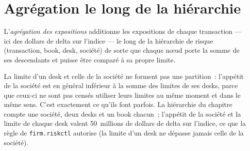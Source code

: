 \section{Agrégation le long de la hiérarchie}

\begin{definition}\label{def:pl:real-time-risk:aggregation}
L'\emph{agrégation des expositions} additionne les expositions de chaque transaction --- ici des dollars de delta sur l'indice --- le long de la
hiérarchie de risque (transaction, book, desk, société) de sorte que chaque nœud porte la somme de ses descendants et puisse être comparé à sa propre limite.
\end{definition}

La limite d'un desk et celle de la société ne forment pas une partition~: l'appétit de la société est en général inférieur à la somme des limites de ses desks, parce que ceux-ci
ne sont pas censés utiliser leurs limites au même moment et dans le même sens. C'est exactement ce qu'ils font parfois. La hiérarchie du chapitre
compte une société, deux desks et un book chacun~; l'appétit de la société et la limite de chaque desk valent 50~millions de dollars de delta sur l'indice, ce que
la règle de \texttt{firm.riskctl} autorise (la limite d'un desk ne dépasse jamais celle de la société).

\begin{omfigure}

\label{fig:pl:real-time-risk:hierarchy}
\end{omfigure}

